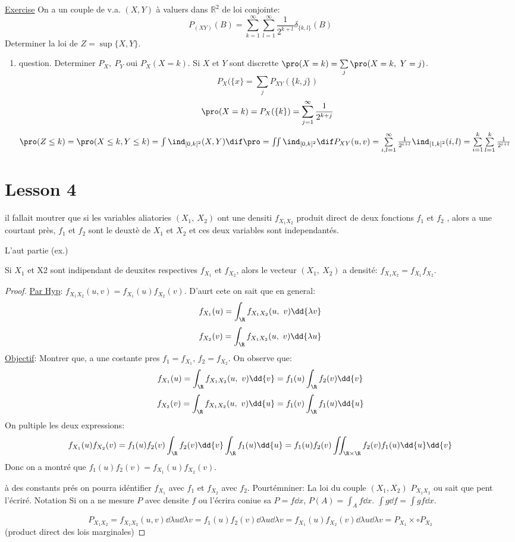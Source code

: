 \underline{Exercise}
On a un couple de v.a. $(X, Y)$ à valuers dans $\mathbb{R}^2$ de loi conjointe:
$$P_{(XY)}(B)=\sum_{k=1}^\infty\sum_{l=1}^\infty \frac{1}{2^{k+l}}\delta_{\{k, l\}}(B)$$
Determiner la loi de $Z=\sup \{X, Y\}$.
\begin{enumerate}
	\item{question}. Determiner $P_X,\ P_Y$ oui $P_X(X=k)$.
Si $X$ et $Y$ sont discrette $\pro (X=k)=\sum\limits_j\pro (X=k,\ Y=j)$. $$P_X(\{x\}=\sum\limits_j P_{XY}(\{k, j\})$$
$$\pro (X=k)=P_X(\{k\})=\sum\limits_{j=1}^\infty \frac{1}{2^{k+j}}$$
$\pro (Z\leq k)=\pro (X\leq k, Y\leq k)=\int \ind _{[0, k]^2}(X, Y)\dif \pro =\iint \ind _{[0, k]^2} \dif P_{XY}(u, v)=\sum\limits_{i,l=1}^\infty \frac{1}{2^{i+l}}\ind _{[1, k]^2}(i, l)=\sum\limits_{i=1}^k\sum\limits_{l=1}^k\frac{1}{2^{i+l}}$
\end{enumerate}

\section{Lesson 4} %
\label{sec:lesson_4}

il fallait moutrer que si les variables aliatories $(X_1,\ X_2)$ ont une densiti $f_{X_1X_2}$ produit direct de deux fonctions $f_1$ et $f_2$ , alors a une courtant près, $f_1$ et $f_2$  sont le deuxtè de $X_1$ et $X_2$ et ces deux variables sont independantés.

L'aut partie (ex.)

Si $X_1$ et X2 sont indipendant de deuxites respectives $f_{X_1}$ et $f_{X_2}$, alors le vecteur $(X_1,\ X_2)$ a densité: $f_{X_1X_2}=f_{X_1} f_{X_2}$.

\begin{proof}
	\underline{Par Hyp}: $f_{X_1X_2}(u, v)=f_{X_1}(u) f_{X_2}(v)$. D'aurt cete on sait que en general:
	$$f_{X_1}(u)=\int_{\R}f_{X_1X_2}(u,\ v)\dd{\lambda v}$$
	$$f_{X_2}(v)=\int_{\R}f_{X_1X_2}(u,\ v)\dd{\lambda u}$$
	\underline{Objectif}: Montrer que, a une costante pres $f_1=f_{X_1}$, $f_2=f_{X_2}$. On observe que:
	$$f_{X_1}(u)=\int_{\R}f_{X_1X_2}(u,\ v)\dd{v}=f_1(u)\int_\R f_2(v)\dd{v}$$
	$$f_{X_2}(v)=\int_{\R}f_{X_1X_2}(u,\ v)\dd{u}=f_1(v)\int_\R f_1(u)\dd{u}$$
	On pultiple les deux expressions:
	$$f_{X_1}(u)f_{X_2}(v)=f_1(u)f_2(v)\int_\R f_2(v)\dd{v}\int_\R f_1(u)\dd{u}=f_1(u)f_2(v)\iint_{\R\times\R} f_2(v) f_1(u)\dd{u}\dd{v}$$
	Donc on a montré que $f_1(u)f_2(v)=f_{X_1}(u)f_{X_2}(v)$.
	\begin{remark}
		à des constants prés on pourra idéntifier $f_{X_1}$ avec $f_1$ et $f_{X_2}$ avec $f_2$. Pourtémniner: La loi du couple $(X_1, X_2)$ $P_{X_1X_2}$ ou sait que pent l'écriré. Notation Si on a ne mesure $P$ avec densite $f$ ou l'écrira coniue sa $P=f\dd{x}$, $P(A)=\int_A f\dd{x}$. $\int g\dd{f}=\int g f\dd{x}$.
	\end{remark}
		$$P_{X_1X_2}=f_{X_1X_2}(u, v)\dd{\lambda u}\dd{\lambda v}=f_1(u)f_2(v)\dd{\lambda u}\dd{\lambda v}=f_{X_1}(u)f_{X_2}(v)\dd{\lambda u}\dd{\lambda v}=P_{X_1}\times\circ P_{X_2}$$(product direct des lois marginales)

\end{proof}

